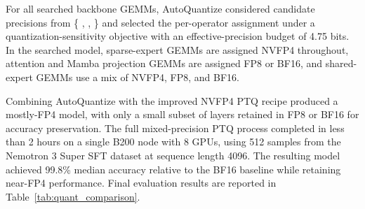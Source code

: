 \begin{table}[h]
\vspace{2pt}
\begin{minipage}{\linewidth}
\footnotesize
\footnotesize
For all searched backbone GEMMs, AutoQuantize considered candidate precisions from \{ , ,  \} and selected the per-operator assignment under a quantization-sensitivity objective with an effective-precision budget of 4.75 bits. In the searched model, sparse-expert GEMMs are assigned NVFP4 throughout, attention and Mamba projection GEMMs are assigned FP8 or BF16, and shared-expert GEMMs use a mix of NVFP4, FP8, and BF16.
\end{minipage}
\end{table}

Combining AutoQuantize with the improved NVFP4 PTQ recipe produced a mostly-FP4 model, with only a small subset of layers retained in FP8 or BF16 for accuracy preservation. The full mixed-precision PTQ process completed in less than 2 hours on a single B200 node with 8 GPUs, using 512 samples from the Nemotron 3 Super SFT dataset at sequence length 4096. The resulting model achieved 99.8\% median accuracy relative to the BF16 baseline while retaining near-FP4 performance. Final evaluation results are reported in Table~\ref{tab:quant_comparison}.


